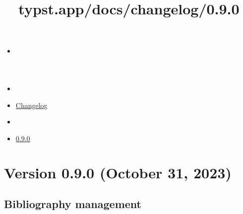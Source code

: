 \title{typst.app/docs/changelog/0.9.0}

\begin{itemize}
\tightlist
\item
  \href{/docs}{}
\item
  
\item
  \href{/docs/changelog/}{Changelog}
\item
  
\item
  \href{/docs/changelog/0.9.0/}{0.9.0}
\end{itemize}

\section{Version 0.9.0 (October 31,
2023)}\label{version-0.9.0-october-31-2023}

\subsection{Bibliography management}\label{bibliography-management}

